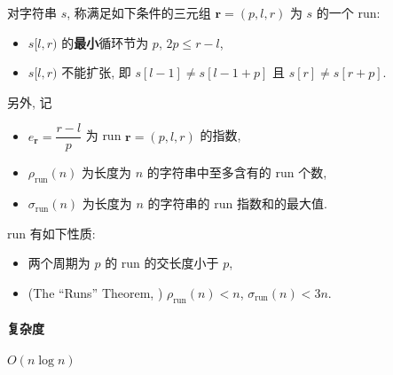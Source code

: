 对字符串 \(s\), 称满足如下条件的三元组 \(\mathbf{r}=(p,l,r)\) 为 \(s\) 的一个 run:

\begin{itemize}
    \item \(s[l,r)\) 的\textbf{最小}循环节为 \(p\), \(2p\leq r-l\),
    \item \(s[l,r)\) 不能扩张, 即 \(s[l-1]\ne s[l-1+p]\) 且 \(s[r]\ne s[r+p]\).
\end{itemize}

另外, 记

\begin{itemize}
    \item \(e_{\mathbf{r}}=\dfrac{r-l}{p}\) 为 run \(\mathbf{r}=(p,l,r)\) 的指数,
    \item \(\rho_{\textrm{run}}(n)\) 为长度为 \(n\) 的字符串中至多含有的 run 个数,
    \item \(\sigma_{\textrm{run}}(n)\) 为长度为 \(n\) 的字符串的 run 指数和的最大值.
\end{itemize}

run 有如下性质:

\begin{itemize}
    \item 两个周期为 \(p\) 的 run 的交长度小于 \(p\),
    \item (The ``Runs'' Theorem, \cite{bannai2017runs}) \(\rho_{\textrm{run}}(n)<n\), \(\sigma_{\textrm{run}}(n)<3n\).
\end{itemize}

\paragraph{复杂度} \(O(n\log n)\)
